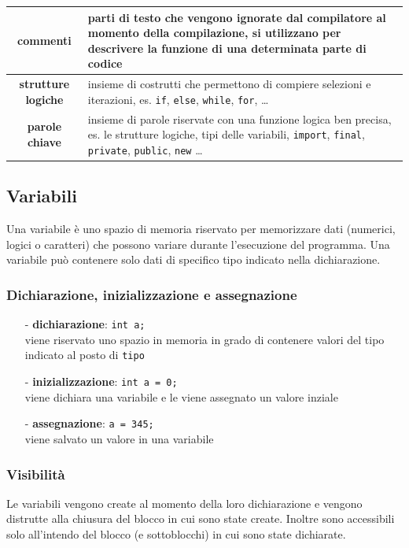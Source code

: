 \documentclass[a4paper]{article}
\begin{document}
\begin{center}
\begin{tabularx}{\textwidth}{c X}
		\textbf{commenti}
		& parti di testo che vengono ignorate dal compilatore al momento della compilazione, si utilizzano per descrivere
		la funzione di una determinata parte di codice \\
		\midrule

		\textbf{strutture logiche}
		& insieme di costrutti che permettono di compiere selezioni e iterazioni, es. \verb|if|, \verb|else|, \verb|while|,
		\verb|for|, \dots \\
		\midrule

		\textbf{parole chiave}
		& insieme di parole riservate con una funzione logica ben precisa, es. le strutture logiche, tipi delle variabili,
		\verb|import|, \verb|final|, \verb|private|, \verb|public|, \verb|new| \dots
	\end{tabularx}
\end{center}


\subsection{Variabili}
Una variabile è uno spazio di memoria riservato per memorizzare dati (numerici, logici o caratteri) che possono variare
durante l'esecuzione del programma. Una variabile può contenere solo dati di specifico tipo indicato nella dichiarazione.

\subsubsection*{Dichiarazione, inizializzazione e assegnazione}
\begin{itemize}[topsep=3pt, itemsep=0pt]
	\item[-] \textbf{dichiarazione}: \verb|int a;| \\
	viene riservato uno spazio in memoria in grado di contenere valori del tipo indicato al posto di \verb|tipo|
	\item[-] \textbf{inizializzazione}: \verb|int a = 0;| \\
	viene dichiara una variabile e le viene assegnato un valore inziale
	\item[-] \textbf{assegnazione}: \verb|a = 345;| \\
	viene salvato un valore in una variabile
\end{itemize}

\subsubsection*{Visibilità}
Le variabili vengono create al momento della loro dichiarazione e vengono distrutte alla chiusura del blocco in cui sono
state create. Inoltre sono accessibili solo all'intendo del blocco (e sottoblocchi) in cui sono state dichiarate.
\end{document}
